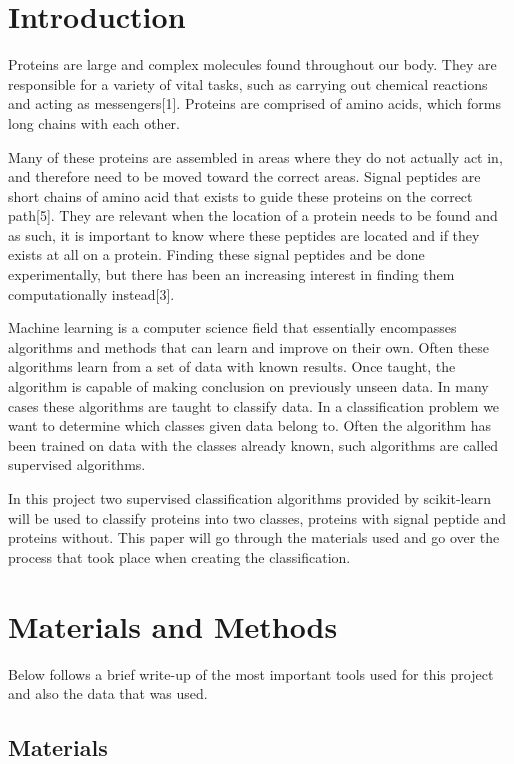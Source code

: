 \documentclass[10pt,letterpaper]{article}
\begin{document}
\section*{Introduction}
Proteins are large and complex molecules found throughout our body. They are responsible for a variety of vital tasks, such as carrying out chemical reactions and acting as messengers[1]. Proteins are comprised of amino acids, which forms long chains with each other. 

Many of these proteins are assembled in areas where they do not actually act in, and therefore need to be moved toward the correct areas. Signal peptides are short chains of amino acid that exists to guide these proteins on the correct path[5]. They are relevant when the location of a protein needs to be found and as such, it is important to know where these peptides are located and if they exists at all on a protein. Finding these signal peptides and be done experimentally, but there has been an increasing interest in finding them computationally instead[3]. 

Machine learning is a computer science field that essentially encompasses algorithms and methods that can learn and improve on their own. Often these algorithms learn from a set of data with known results. Once taught, the algorithm is capable of making conclusion on previously unseen data. In many cases these algorithms are taught to classify data. In a classification problem we want to determine which classes given data belong to. Often the algorithm has been trained on data with the classes already known, such algorithms are called supervised algorithms. 

In this project two supervised classification algorithms provided by scikit-learn will be used to classify proteins into two classes, proteins with signal peptide and proteins without. This paper will go through the materials used and go over the process that took place when creating the classification. 


\section*{Materials and Methods}
Below follows a brief write-up of the most important tools used for this project and also the data that was used.  

\subsection*{Materials}
\end{document}
